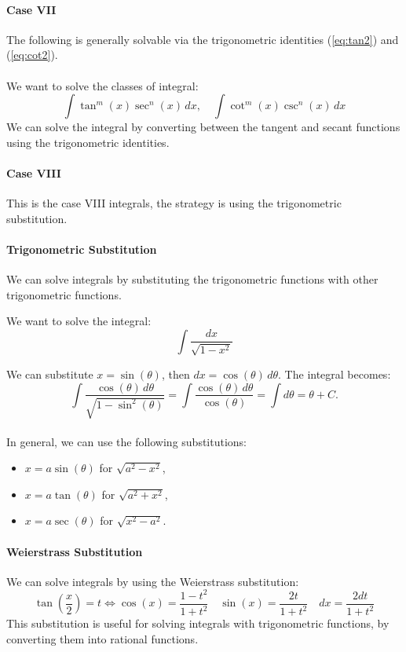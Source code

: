 \documentclass[11pt]{report}
\begin{document}
\paragraph{Case VII} The following is generally solvable via the trigonometric identities (\ref{eq:tan2}) and (\ref{eq:cot2}).
\paragraph{} We want to solve the classes of integral:
\begin{equation} \int \tan^m(x) \sec^n(x) \, dx, \quad \int \cot^m(x) \csc^n(x) \, dx \end{equation}
We can solve the integral by converting between the tangent and secant functions using the trigonometric identities.
\paragraph{Case VIII} This is the case VIII integrals, the strategy is using the trigonometric substitution.
\paragraph{Trigonometric Substitution} We can solve integrals by substituting the trigonometric functions with other trigonometric functions.
\begin{example}
We want to solve the integral:
$$ \int \frac{dx}{\sqrt{1 - x^2}} $$
\end{example}
We can substitute $x = \sin(\theta)$, then $dx = \cos(\theta) \, d\theta$. The integral becomes:
$$ \int \frac{\cos(\theta) \, d\theta}{\sqrt{1 - \sin^2(\theta)}} = \int \frac{\cos(\theta) \, d\theta}{\cos(\theta)} = \int d\theta = \theta + C. $$
\paragraph{} In general, we can use the following substitutions:
\begin{itemize}
    \item $x = a\sin(\theta)$ for $\sqrt{a^2 - x^2}$,
    \item $x = a\tan(\theta)$ for $\sqrt{a^2 + x^2}$,
    \item $x = a\sec(\theta)$ for $\sqrt{x^2 - a^2}$.
\end{itemize}
\paragraph{Weierstrass Substitution} We can solve integrals by using the Weierstrass substitution:
\begin{equation}
    \tan\left(\frac{x}{2}\right) = t \Leftrightarrow \cos(x) = \frac{1-t^2}{1+t^2} \quad \sin(x) = \frac{2t}{1+t^2} \quad dx = \frac{2dt}{1+t^2}
\end{equation}
This substitution is useful for solving integrals with trigonometric functions, by converting them into rational functions.
\end{document}
